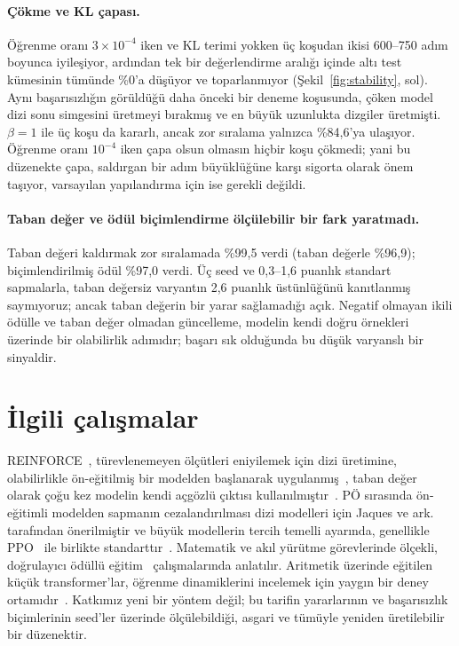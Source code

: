 \documentclass[10pt,twocolumn]{article}
\begin{document}
\paragraph{Çökme ve KL çapası.}
Öğrenme oranı $3\times10^{-4}$ iken ve KL terimi yokken üç koşudan ikisi 600--750 adım boyunca
iyileşiyor, ardından tek bir değerlendirme aralığı içinde altı test kümesinin tümünde \%0'a
düşüyor ve toparlanmıyor (Şekil~\ref{fig:stability}, sol). Aynı başarısızlığın görüldüğü daha
önceki bir deneme koşusunda, çöken model dizi sonu simgesini üretmeyi bırakmış ve en büyük
uzunlukta dizgiler üretmişti. $\beta=1$ ile üç koşu da kararlı, ancak zor sıralama yalnızca
\%84,6'ya ulaşıyor. Öğrenme oranı $10^{-4}$ iken çapa olsun olmasın hiçbir koşu çökmedi; yani bu
düzenekte çapa, saldırgan bir adım büyüklüğüne karşı sigorta olarak önem taşıyor, varsayılan
yapılandırma için ise gerekli değildi.

\paragraph{Taban değer ve ödül biçimlendirme ölçülebilir bir fark yaratmadı.}
Taban değeri kaldırmak zor sıralamada \%99,5 verdi (taban değerle \%96,9); biçimlendirilmiş ödül
\%97,0 verdi. Üç seed ve 0,3--1,6 puanlık standart sapmalarla, taban değersiz varyantın 2,6
puanlık üstünlüğünü kanıtlanmış saymıyoruz; ancak taban değerin bir yarar sağlamadığı açık.
Negatif olmayan ikili ödülle ve taban değer olmadan güncelleme, modelin kendi doğru örnekleri
üzerinde bir olabilirlik adımıdır; başarı sık olduğunda bu düşük varyanslı bir sinyaldir.

\section{İlgili çalışmalar}
REINFORCE~\cite{williams1992}, türevlenemeyen ölçütleri eniyilemek için dizi üretimine, olabilirlikle
ön-eğitilmiş bir modelden başlanarak uygulanmış~\cite{ranzato2016}, taban değer olarak çoğu kez
modelin kendi açgözlü çıktısı kullanılmıştır~\cite{rennie2017}. PÖ sırasında ön-eğitimli modelden
sapmanın cezalandırılması dizi modelleri için Jaques ve ark.~\cite{jaques2017} tarafından
önerilmiştir ve büyük modellerin tercih temelli ayarında, genellikle PPO~\cite{schulman2017} ile
birlikte standarttır~\cite{ouyang2022}. Matematik ve akıl yürütme görevlerinde ölçekli, doğrulayıcı
ödüllü eğitim~\cite{shao2024,guo2025} çalışmalarında anlatılır. Aritmetik üzerinde eğitilen küçük
transformer'lar, öğrenme dinamiklerini incelemek için yaygın bir deney ortamıdır~\cite{lee2024}.
Katkımız yeni bir yöntem değil; bu tarifin yararlarının ve başarısızlık biçimlerinin seed'ler
üzerinde ölçülebildiği, asgari ve tümüyle yeniden üretilebilir bir düzenektir.
\end{document}
